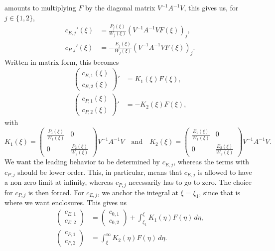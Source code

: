 \documentclass[11pt]{article}
\begin{document}
amounts to multiplying \(F\) by the diagonal matrix
\(V^{-1}A^{-1}V\), this gives us, for \(j \in \{1, 2\}\),
\begin{align*}
  c_{E,j}'(\xi) &= \frac{P_{j}(\xi)}{W_{j}(\xi)}\left(V^{-1}A^{-1}VF(\xi)\right)_{j},\\
  c_{P,j}'(\xi) &= -\frac{E_{j}(\xi)}{W_{j}(\xi)}\left(V^{-1}A^{-1}VF(\xi)\right)_{j}.
\end{align*}
Written in matrix form, this becomes
\begin{align*}
  \begin{pmatrix} c_{E,1}(\xi) \\ c_{E,2}(\xi) \end{pmatrix}'
  &= K_{1}(\xi)F(\xi),\\
  \begin{pmatrix} c_{P,1}(\xi) \\ c_{P,2}(\xi) \end{pmatrix}'
  &= -K_{2}(\xi)F(\xi),
\end{align*}
with
\begin{equation}\label{eq:K_1-K_2}
  K_{1}(\xi) =
  \begin{pmatrix}
    \frac{P_{1}(\xi)}{W_{1}(\xi)} & 0\\ 0 & \frac{P_{2}(\xi)}{W_{2}(\xi)}
  \end{pmatrix}V^{-1}A^{-1}V
  \quad\text{and}\quad
  K_{2}(\xi) =
  \begin{pmatrix}
    \frac{E_{1}(\xi)}{W_{1}(\xi)} & 0\\ 0 & \frac{E_{2}(\xi)}{W_{2}(\xi)}
  \end{pmatrix}V^{-1}A^{-1}V.
\end{equation}
We want the leading behavior to be determined by \(c_{E,j}\), whereas
the terms with \(c_{P,j}\) should be lower order. This, in particular,
means that \(c_{E,j}\) is allowed to have a non-zero limit at
infinity, whereas \(c_{P,j}\) necessarily has to go to zero. The
choice for \(c_{P,j}\) is then forced. For \(c_{E,j}\), we anchor the
integral at \(\xi = \xi_{1}\), since that is where we want enclosures.
This gives us
\begin{align*}
  \begin{pmatrix} c_{E,1} \\ c_{E,2} \end{pmatrix}
  &= \begin{pmatrix} c_{0,1} \\ c_{0,2} \end{pmatrix}
  + \int_{\xi_{1}}^{\xi} K_{1}(\eta)F(\eta)\,d\eta,\\
  \begin{pmatrix} c_{P,1} \\ c_{P,2} \end{pmatrix}
  &= \int_{\xi}^{\infty} K_{2}(\eta)F(\eta)\,d\eta.
\end{align*}
\end{document}
